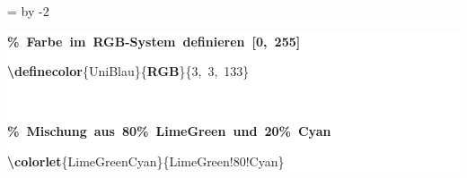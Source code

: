 \begingroup
\ttfamily
{}
=\textwidth
\advance{} by -2\fboxsep
\noindent
\colorbox{background}
{%
\parbox{\dimen255}
{%
\rule[-0.5ex]{0pt}{2.5ex}\hspace*{0.0em}\textcolor{G}{\textbf{\%~Farbe~im~RGB{-}System~definieren~[0,~255]}}\\
\rule[-0.5ex]{0pt}{2.5ex}\hspace*{0.0em}\textcolor{R}{\textbf{\textbackslash{}definecolor}}\{UniBlau\}\{\textcolor{R}{\textbf{RGB}}\}\{3,~3,~133\}\\
\rule[-0.5ex]{0pt}{2.5ex}\hspace*{0.0em}\\
\rule[-0.5ex]{0pt}{2.5ex}\hspace*{0.0em}\textcolor{G}{\textbf{\%~Mischung~aus~80\%~LimeGreen~und~20\%~Cyan}}\\
\rule[-0.5ex]{0pt}{2.5ex}\hspace*{0.0em}\textcolor{R}{\textbf{\textbackslash{}colorlet}}\{LimeGreenCyan\}\{LimeGreen!80!Cyan\}}%
}%
\endgroup
